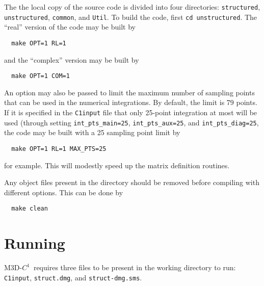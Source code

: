 \documentclass[letterpaper]{book}
\newcommand{\codename}{M3D-$C^1$}
\begin{document}
The the local copy of the source code is divided into four
directories: \texttt{structured}, \texttt{unstructured},
\texttt{common}, and \texttt{Util}.  To build the code, first
\texttt{cd unstructured}.  The ``real'' version of the code may be
built by
\begin{verbatim}
  make OPT=1 RL=1
\end{verbatim}
and the ``complex'' version may be built by
\begin{verbatim}
  make OPT=1 COM=1
\end{verbatim}
An option may also be passed to limit the maximum number of sampling
points that can be used in the numerical integrations.  By default,
the limit is 79 points.  If it is specified in the \texttt{C1input}
file that only 25-point integration at most will be used (through
setting \texttt{int\_pts\_main=25}, \texttt{int\_pts\_aux=25}, and
\texttt{int\_pts\_diag=25}, the code may be built with a 25 sampling
point limit by 
\begin{verbatim}
  make OPT=1 RL=1 MAX_PTS=25
\end{verbatim}
for example.  This will modestly speed up the matrix definition
routines.

 Any object files present in the directory should be removed before
 compiling with different options.  This can be done by
\begin{verbatim}
  make clean
\end{verbatim}


\section{Running}

\codename\ requires three files to be present in the working directory
to run: \texttt{C1input}, \texttt{struct.dmg}, and
\texttt{struct-dmg.sms}.
\end{document}
